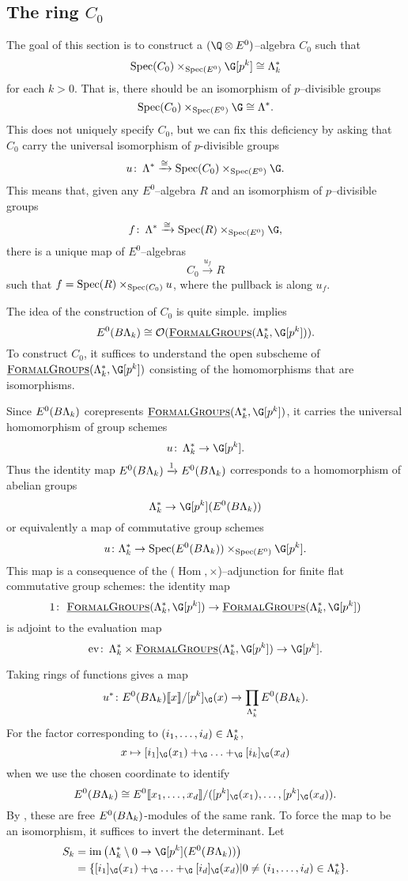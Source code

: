 \subsection*{The ring $C_0$}


The goal of this section is to construct a $(\Q \otimes E^0)$--algebra $C_0$ such that
\[
\Spec(C_0) \times_{\Spec(E^0)} \G[p^k] \cong \Lambda_{k}^*
\]
for each $k>0$. That is, there should be an isomorphism of $p$--divisible groups
\[
\Spec(C_0) \times_{\Spec(E^0)} \G \cong \Lambda^*.
\]
This does not uniquely specify $C_0$, but we can fix this deficiency by asking that $C_0$ carry the universal isomorphism of $p$-divisible groups 
\[
u \co \Lambda^* \xrightarrow{\cong} \Spec(C_0) \times_{\Spec(E^0)} \G.
\]
This means that, given any $E^0$--algebra $R$ and an isomorphism of $p$--divisible groups
\[
f \co \Lambda^* \xrightarrow{\cong} \Spec(R) \times_{\Spec(E^0)} \G,
\]
there is a unique map of $E^0$--algebras
\[
C_0 \xrightarrow{u_f} R
\]
such that $f = \operatorname{Spec}(R) \times_{\operatorname{Spec}(C_0)} u$, where the pullback is along $u_f$.

The idea of the construction of $C_0$ is quite simple.   implies \[E^0(B\Lk) \cong \sheaf O(\InternalHom{FormalGroups}(\Lk^*,\G[p^k])).\]  To construct $C_0$, it suffices to understand the open subscheme of $\InternalHom{FormalGroups}(\Lk^*,\G[p^k])$ consisting of the homomorphisms that are isomorphisms. 

Since $E^0(B\Lambda_k)$ corepresents $\InternalHom{FormalGroups}(\Lk^*,\G[p^k])$, it carries the universal homomorphism of group schemes
\[
u \co \Lk^* \rightarrow \G[p^k].
\]
Thus the identity map $E^0(B\Lambda_k) \xrightarrow{1} E^0(B\Lambda_k)$ corresponds to a homomorphism of abelian groups
\[
\Lk^* \rightarrow \G[p^k](E^0(B\Lk))
\]
or equivalently a map of commutative group schemes
\[
u \colon \Lk^* \rightarrow \Spec(E^0(B\Lk)) \times_{\Spec(E^0)} \G[p^k].
\]
This map is a consequence of the ($\operatorname{Hom}, \times$)--adjunction for finite flat commutative group schemes: the identity map
\[
1 \co \InternalHom{FormalGroups}(\Lk^*,\G[p^k]) \to \InternalHom{FormalGroups}(\Lk^*,\G[p^k])
\]
is adjoint to the evaluation map
\[
\mathrm{ev} \co \Lk^* \times  \InternalHom{FormalGroups}(\Lk^*,\G[p^k]) \to \G[p^k].
\]

Taking rings of functions gives a map
\[
u^* \colon E^0(B\Lk)\ps{x}/[p^k]_{\G}(x) \xrightarrow{} \prod_{\Lk^*} E^0(B\Lk).
\]
For the factor corresponding to $(i_1, \ldots, i_d) \in \Lambda_k^*$, 
\[
x \mapsto [i_1]_{\G}(x_1)+_{\G} \ldots +_{\G} [i_k]_{\G}(x_d)
\]
when we use the chosen coordinate to identify
\[
E^0(B\Lk) \cong E^0\ps{x_1, \ldots, x_d}/([p^k]_{\G}(x_1), \ldots, [p^k]_{\G}(x_d)). 
\]
By , these are free $E^0(B\Lambda_k)$-modules of the same rank. To force the map to be an isomorphism, it suffices to invert the determinant. Let 
\begin{align*}
S_k &= \im \big (\Lk^* \setminus 0 \rightarrow \G[p^k](E^0(B\Lk)) \big ) \\ &= \{ [i_1]_{\G}(x_1)+_{\G} \ldots +_{\G} [i_d]_{\G}(x_d)| 0 \neq (i_1, \ldots, i_d) \in \Lk^* \}.
\end{align*}

